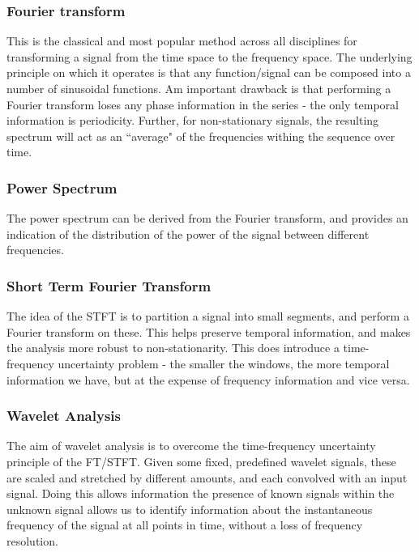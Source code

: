 \documentclass[9pt,conference]{IEEEtran}
\begin{document}
\subsubsection{Fourier transform}
This is the classical and most popular method across all disciplines for transforming a signal from the time space to the frequency space. The underlying principle on which it operates is that any function/signal can be composed into a number of sinusoidal functions.  Am important drawback is that performing a Fourier transform loses any phase information in the series - the only temporal information is periodicity. Further, for non-stationary signals, the resulting spectrum will act as an ``average" of the frequencies withing the sequence over time.
\subsubsection{Power Spectrum}
The power spectrum can be derived from the Fourier transform, and provides an indication of the distribution of the power of the signal between different frequencies.
\subsubsection{Short Term Fourier Transform}
The idea of the STFT is to partition a signal into small segments, and perform a Fourier transform on these. This helps preserve temporal information, and makes the analysis more robust to non-stationarity. This does introduce a time-frequency uncertainty problem - the smaller the windows, the more temporal information we have, but at the expense of frequency information and vice versa.
\subsubsection{Wavelet Analysis}
The aim of wavelet analysis is to overcome the time-frequency uncertainty principle of the FT/STFT. Given some fixed, predefined wavelet signals, these are scaled and stretched by different amounts, and each convolved with an input signal. Doing this allows information the presence of known signals within the unknown signal allows us to identify information about the instantaneous frequency of the signal at all points in time, without a loss of frequency resolution.
\end{document}
